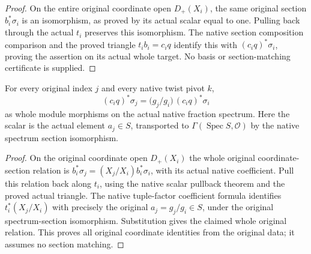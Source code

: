 \begin{proof}
On the entire original coordinate open $D_+(X_i)$, the same original section
$b_i^*\sigma_i$ is an isomorphism, as proved by its actual scalar equal to one.
Pulling back through the actual $t_i$ preserves this isomorphism. The native
section composition comparison and the proved triangle $t_i b_i=c_iq$
identify this with $(c_iq)^*\sigma_i$, proving the assertion on its actual whole
target. No basis or section-matching certificate is supplied.
\end{proof}
\begin{proposition}
\label{prop:whole-original-fraction-projective-coordinate-ratios}
\leanok
For every original index $j$ and every native twist pivot $k$,
\[
(c_iq)^*\sigma_j=\bigl(g_j/g_i\bigr)\,(c_iq)^*\sigma_i
\]
as whole module morphisms on the actual native fraction spectrum. Here the
scalar is the actual element $a_j\in S$, transported to
$\Gamma(\operatorname{Spec}S,\mathcal O)$ by the native spectrum section isomorphism.
\end{proposition}
\begin{proof}
On the original coordinate open $D_+(X_i)$ the whole original coordinate-section
relation is $b_i^*\sigma_j=(X_j/X_i)b_i^*\sigma_i$, with its actual native
coefficient. Pull this relation back along $t_i$, using the native scalar
pullback theorem and the proved actual triangle. The native tuple-factor
coefficient formula identifies $t_i^*(X_j/X_i)$ with precisely the original
$a_j=g_j/g_i\in S$, under the original spectrum-section isomorphism. Substitution
gives the claimed whole original relation. This proves all original coordinate
identities from the original data; it assumes no section matching.
\end{proof}
